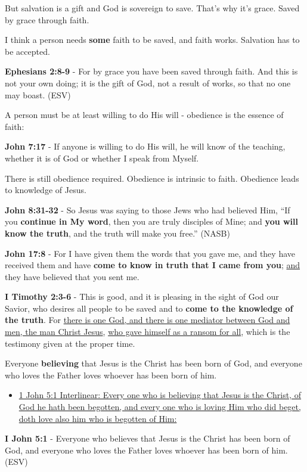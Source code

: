 \documentclass[11pt]{article}
\begin{document}
But salvation is a gift and God is sovereign to save.
That's why it's grace.
Saved by grace through faith.

I think a person needs \textbf{some} faith to be saved, and faith works. Salvation has to be accepted.

\textbf{Ephesians 2:8-9} - For by grace you have been saved through faith. And this is not your own doing; it is the gift of God, not a result of works, so that no one may boast. (ESV)

A person must be at least willing to do His will - obedience is the essence of faith:

\textbf{John 7:17} - If anyone is willing to do His will, he will know of the teaching, whether it is of God or whether I speak from Myself.

There is still obedience required. Obedience is intrinsic to faith. Obedience leads to knowledge of Jesus.

\textbf{John 8:31-32} - So Jesus was saying to those Jews who had believed Him, “If you \textbf{continue in My word}, then you are truly disciples of Mine; and \textbf{you will know the truth}, and the truth will make you free.” (NASB)

\textbf{John 17:8} - For I have given them the words that you gave me, and they have received them and have \textbf{come to know in truth that I came from you}; \uline{and} they have believed that you sent me.

\textbf{I Timothy 2:3-6} - This is good, and it is pleasing in the sight of God our Savior, who desires all people to be saved and to \textbf{come to the knowledge of the truth}. For \uline{there is one God, and there is one mediator between God and men, the man Christ Jesus}, \uline{who gave himself as a ransom for all}, which is the testimony given at the proper time.

Everyone \textbf{believing} that Jesus is the Christ has been born of God, and everyone who loves the Father loves whoever has been born of him.

\begin{itemize}
\item \href{https://biblehub.com/interlinear/1\_john/5-1.htm}{1 John 5:1 Interlinear: Every one who is believing that Jesus is the Christ, of God he hath been begotten, and every one who is loving Him who did beget, doth love also him who is begotten of Him:}
\end{itemize}

\textbf{I John 5:1} - Everyone who believes that Jesus is the Christ has been born of God, and everyone who loves the Father loves whoever has been born of him. (ESV)
\end{document}
